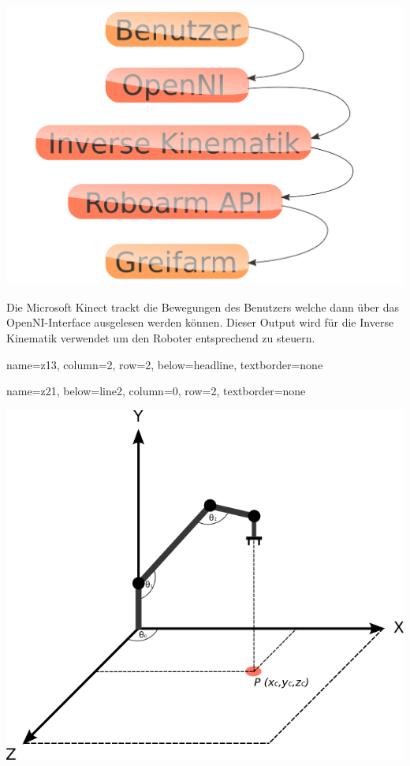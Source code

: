 \documentclass[portrait,a0paper]{baposter}
\begin{document}
\begin{poster}
{\includegraphics[width=\textwidth]{imgs/komponenten.png}

Die Microsoft Kinect trackt die Bewegungen des Benutzers welche dann über das OpenNI-Interface ausgelesen werden können. Dieser Output wird für die Inverse Kinematik verwendet um den Roboter entsprechend zu steuern.
 }
 
  \headerbox{}
    {
    name=z13,
    column=2,
    row=2,
    below=headline,
    textborder=none
    }
    {

 \lipsum[7-7]
 }


    \headerbox{}
    {
    name=z21,
    below=line2,
    column=0,
    row=2,
    textborder=none
    }
    {
        \includegraphics[width=\textwidth]{imgs/3d_robo.png}
        \lipsum[1-1]

}
\end{poster}
\end{document}
